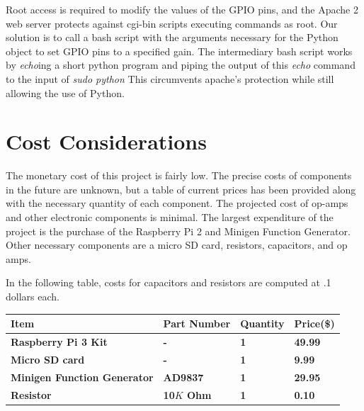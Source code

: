 \documentclass{article}	%
\begin{document}
\begin{multicols}{2}
Root access is required to modify the values of
the GPIO pins, and the Apache 2 web server
protects against cgi-bin scripts executing commands as root.
Our solution is to call a bash script with the arguments
necessary for the Python object to set GPIO pins to
a specified gain.
The intermediary bash script works by
\textit{echo}ing a short python program and
piping the output of this \textit{echo} command to
the input of \textit{sudo python}
This circumvents apache's protection
while still allowing the use of
Python.

\section{Cost Considerations}
The monetary cost of this project is fairly low. 
The precise costs of components in the future are unknown, but
a table 
of current prices has been provided
along with the necessary quantity of each component.
The projected cost of op-amps and other electronic components is minimal. 
The largest expenditure of the project is
the purchase of the 
Raspberry Pi 2 and 
Minigen Function Generator.
Other necessary components are a micro SD card,
resistors, capacitors, and op amps.

In the following table,
costs for capacitors and resistors are computed at .1 dollars each.
\begin{center}
    \begin{tabularx}{0.4\textwidth}{|X|X|X|X|}
        \hline

        \textbf{Item} &
        \textbf{Part Number} &
        \textbf{Quantity} &
        \textbf{Price(\$)} \\
        \hline

        \textbf{Raspberry Pi 3 Kit} &
        \textbf{-} &
        \textbf{1} &
        \textbf{49.99} \\
        \hline

        \textbf{Micro SD card} &
        \textbf{-} &
        \textbf{1} &
        \textbf{9.99} \\
        \hline

        \textbf{Minigen Function Generator} &
        \textbf{AD9837} &
        \textbf{1} &
        \textbf{29.95} \\
        \hline

        \textbf{Resistor} &
        \textbf{10$K$ Ohm} &
        \textbf{1} &
        \textbf{0.10} \\
        \hline


\end{tabularx}
\end{center}
\end{multicols}
\end{document}
